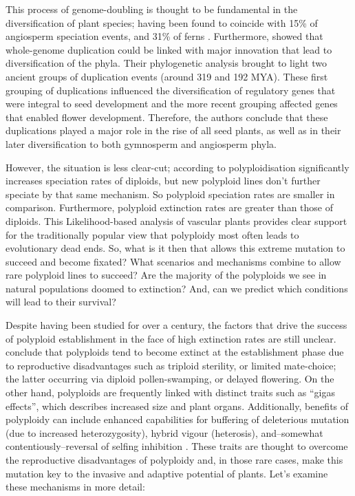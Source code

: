 \documentclass[openany, 12pt, draft]{book}
\begin{document}
This process of genome-doubling is thought to be fundamental in the diversification of plant species; having been found to coincide with 15\% of angiosperm speciation events, and 31\% of ferns \citep{Wood2009}.
Furthermore, \citet{Jiao2011} showed that whole-genome duplication could be linked with major innovation that lead to diversification of the phyla.
Their phylogenetic analysis brought to light two ancient groups of duplication events (around 319 and 192 MYA).
These first grouping of duplications influenced the diversification of regulatory genes that were integral to seed development and the more recent grouping affected genes that enabled flower development.
Therefore, the authors conclude that these duplications played a major role in the rise of all seed plants, as well as in their later diversification to both gymnosperm and angiosperm phyla.

However, the situation is less clear-cut; according to \citet{Mayrose2011} polyploidisation significantly increases speciation rates of diploids, but new polyploid lines don't further speciate by that same mechanism.
So polyploid speciation rates are smaller in comparison.
Furthermore, polyploid extinction rates are greater than those of diploids.
This Likelihood-based analysis of vascular plants provides clear support for the traditionally popular view that polyploidy most often leads to evolutionary dead ends.
So, what is it then that allows this extreme mutation to succeed and become fixated?
What scenarios and mechanisms combine to allow rare polyploid lines to succeed?
Are the majority of the polyploids we see in natural populations doomed to extinction?
And, can we predict which conditions will lead to their survival?

Despite having been studied for over a century, the factors that drive the success of polyploid establishment in the face of high extinction rates are still unclear.
\citet{Arrigo2012} conclude that polyploids tend to become extinct at the establishment phase due to reproductive disadvantages such as triploid sterility, or limited mate-choice; the latter occurring via diploid pollen-swamping, or delayed flowering.
On the other hand, polyploids are frequently linked with distinct traits such as ``gigas effects'', which describes increased size and plant organs.
Additionally, benefits of polyploidy can include enhanced capabilities for buffering of deleterious mutation (due to increased heterozygosity), hybrid vigour (heterosis), and--somewhat contentiously--reversal of selfing inhibition \citep{Woodhouse2009, Ramsey2014}.
These traits are thought to overcome the reproductive disadvantages of polyploidy and, in those rare cases, make this mutation key to the invasive and adaptive potential of plants. Let's examine these mechanisms in more detail:
\end{document}
